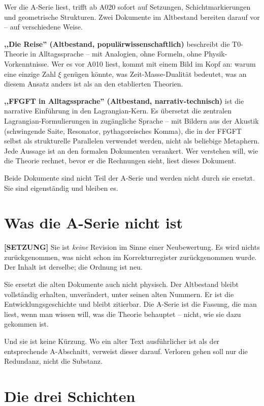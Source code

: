 Wer die A-Serie liest, trifft ab A020 sofort auf Setzungen, Schichtmarkierungen
und geometrische Strukturen. Zwei Dokumente im Altbestand bereiten darauf vor --
auf verschiedene Weise.

\textbf{,,Die Reise'' (Altbestand, populärwissenschaftlich)} beschreibt die
T0-Theorie in Alltagssprache -- mit Analogien, ohne Formeln, ohne
Physik-Vorkenntnisse. Wer es vor A010 liest, kommt mit einem Bild im Kopf
an: warum eine einzige Zahl $\xi$ genügen könnte, was Zeit-Masse-Dualität
bedeutet, was an diesem Ansatz anders ist als an den etablierten Theorien.

\textbf{,,FFGFT in Alltagssprache'' (Altbestand, narrativ-technisch)} ist die
narrative Einführung in den Lagrangian-Kern. Es übersetzt die zentralen
Lagrangian-Formulierungen in zugängliche Sprache -- mit Bildern aus der
Akustik (schwingende Saite, Resonator, pythagoreisches Komma), die in der
FFGFT selbst als strukturelle Parallelen verwendet werden, nicht als beliebige
Metaphern. Jede Aussage ist an den formalen Dokumenten verankert. Wer verstehen
will, wie die Theorie rechnet, bevor er die Rechnungen sieht, liest dieses
Dokument.

Beide Dokumente sind nicht Teil der A-Serie und werden nicht durch sie ersetzt.
Sie sind eigenständig und bleiben es.

\section{Was die A-Serie nicht ist}

\textbf{[SETZUNG]} Sie ist \emph{keine} Revision im Sinne einer Neubewertung. Es wird nichts
zurückgenommen, was nicht schon im Korrekturregister zurückgenommen wurde. Der
Inhalt ist derselbe; die Ordnung ist neu.

Sie ersetzt die alten Dokumente auch nicht physisch. Der Altbestand bleibt
vollständig erhalten, unverändert, unter seinen alten Nummern. Er ist die
Entwicklungsgeschichte und bleibt zitierbar. Die A-Serie ist die Fassung, die
man liest, wenn man wissen will, was die Theorie behauptet -- nicht, wie sie
dazu gekommen ist.

Und sie ist keine Kürzung. Wo ein alter Text ausführlicher ist als der
entsprechende A-Abschnitt, verweist dieser darauf. Verloren gehen soll nur die
Redundanz, nicht die Substanz.

\section{Die drei Schichten}

